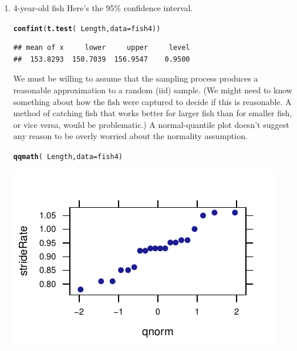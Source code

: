 \documentclass[twoside]{book}\usepackage[]{graphicx}\usepackage[]{xcolor}
\makeatletter
\def\maxwidth{ %
  \ifdim\Gin@nat@width>\linewidth
    \linewidth
  \else
    \Gin@nat@width
  \fi
}
\newcommand{\hlopt}[1]{\textcolor[rgb]{0,0,0}{#1}}%
\newcommand{\hlstd}[1]{\textcolor[rgb]{0.345,0.345,0.345}{#1}}%
\newcommand{\hlkwc}[1]{\textcolor[rgb]{0.333,0.667,0.333}{#1}}%
\newcommand{\hlkwd}[1]{\textcolor[rgb]{0.737,0.353,0.396}{\textbf{#1}}}%
\newenvironment{kframe}{%
 \def\at@end@of@kframe{}%
 \ifinner\ifhmode%
  \def\at@end@of@kframe{\end{minipage}}%
  \begin{minipage}{\columnwidth}%
 \fi\fi%
 \def\FrameCommand##1{\hskip\@totalleftmargin \hskip-\fboxsep
 \colorbox{shadecolor}{##1}\hskip-\fboxsep
     \hskip-\linewidth \hskip-\@totalleftmargin \hskip\columnwidth}%
 \MakeFramed {\advance\hsize-\width
   \@totalleftmargin\z@ \linewidth\hsize
   \@setminipage}}%
 {\par\unskip\endMakeFramed%
 \at@end@of@kframe}
\newenvironment{knitrout}{}{} %
\makeatother
\begin{document}
\begin{solution}
	\begin{enumerate}
		\item 4-year-old fish
Here's the 95\% confidence interval.
\begin{knitrout}
\color{fgcolor}\begin{kframe}
\begin{alltt}
\hlkwd{confint}\hlstd{(}\hlkwd{t.test}\hlstd{(}\hlopt{~}\hlstd{Length,} \hlkwc{data} \hlstd{= fish4))}
\end{alltt}
\begin{verbatim}
## mean of x     lower     upper     level 
##  153.8293  150.7039  156.9547    0.9500
\end{verbatim}
\end{kframe}
\end{knitrout}
\noindent
We must be willing to assume that the sampling process produces a reasonable approximation
to a random (iid) sample.  (We might need to know something about how the fish were 
captured to decide if this is reasonable.  A method of catching fish that works better for 
larger fish than for smaller fish, or vice versa, would be problematic.)  
A normal-quantile plot doesn't suggest any reason to be overly worried about
the normality assumption.
\begin{knitrout}
\color{fgcolor}\begin{kframe}
\begin{alltt}
\hlkwd{qqmath}\hlstd{(}\hlopt{~}\hlstd{Length,} \hlkwc{data} \hlstd{= fish4)}
\end{alltt}
\end{kframe}

{\centering \includegraphics[width=\maxwidth]{figures/fig-unnamed-chunk-145-1} 

}
\end{knitrout}
\end{enumerate}
\end{solution}
\end{document}
